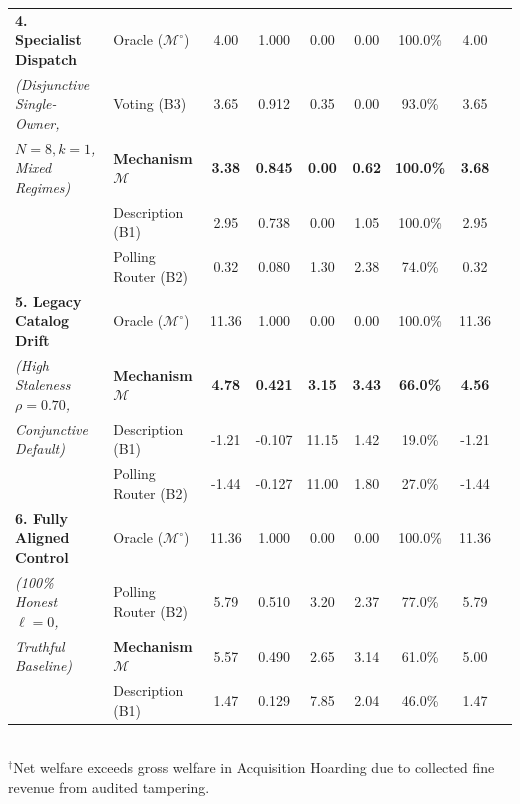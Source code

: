 \documentclass{article}
\theoremstyle{definition}
\begin{document}
\begin{table}[!htbp]
{\begin{tabular}{llccccccc}
\midrule
\textbf{4. Specialist Dispatch} & Oracle ($\mathcal{M}^\circ$) & 4.00 & 1.000 & 0.00 & 0.00 & 100.0\% & 4.00 \\
\emph{(Disjunctive Single-Owner,} & Voting (B3) & 3.65 & 0.912 & 0.35 & 0.00 & 93.0\% & 3.65 \\
\emph{$N=8, k=1$, Mixed Regimes)} & \textbf{Mechanism $\mathcal{M}$} & \textbf{3.38} & \textbf{0.845} & \textbf{0.00} & \textbf{0.62} & \textbf{100.0\%} & \textbf{3.68} \\
& Description (B1) & 2.95 & 0.738 & 0.00 & 1.05 & 100.0\% & 2.95 \\
& Polling Router (B2) & 0.32 & 0.080 & 1.30 & 2.38 & 74.0\% & 0.32 \\
\midrule
\textbf{5. Legacy Catalog Drift} & Oracle ($\mathcal{M}^\circ$) & 11.36 & 1.000 & 0.00 & 0.00 & 100.0\% & 11.36 \\
\emph{(High Staleness $\rho = 0.70$,} & \textbf{Mechanism $\mathcal{M}$} & \textbf{4.78} & \textbf{0.421} & \textbf{3.15} & \textbf{3.43} & \textbf{66.0\%} & \textbf{4.56} \\
\emph{Conjunctive Default)} & Description (B1) & -1.21 & -0.107 & 11.15 & 1.42 & 19.0\% & -1.21 \\
& Polling Router (B2) & -1.44 & -0.127 & 11.00 & 1.80 & 27.0\% & -1.44 \\
\midrule
\textbf{6. Fully Aligned Control} & Oracle ($\mathcal{M}^\circ$) & 11.36 & 1.000 & 0.00 & 0.00 & 100.0\% & 11.36 \\
\emph{(100\% Honest $\ell = 0$,} & Polling Router (B2) & 5.79 & 0.510 & 3.20 & 2.37 & 77.0\% & 5.79 \\
\emph{Truthful Baseline)} & \textbf{Mechanism $\mathcal{M}$} & 5.57 & 0.490 & 2.65 & 3.14 & 61.0\% & 5.00 \\
& Description (B1) & 1.47 & 0.129 & 7.85 & 2.04 & 46.0\% & 1.47 \\
\bottomrule
\end{tabular}%
}
\vspace{1mm}
\footnotesize \\
$^\dagger$Net welfare exceeds gross welfare in Acquisition Hoarding due to collected fine revenue from audited tampering.
\end{table}
\end{document}
